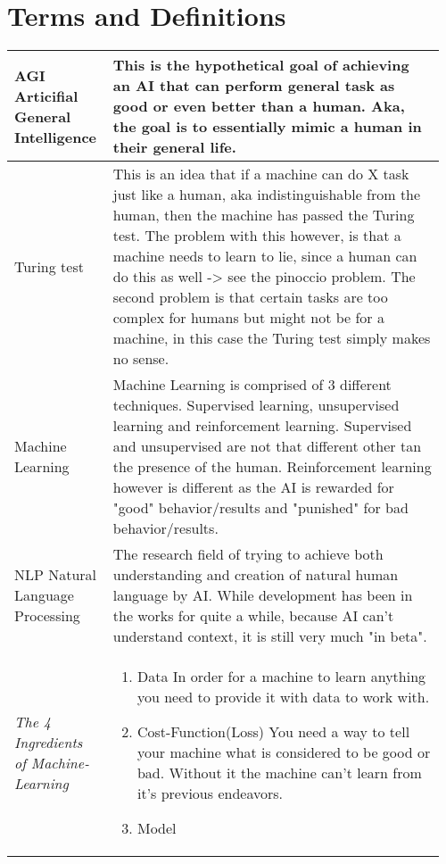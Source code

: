 \documentclass[main.tex,fontsize=8pt,paper=a4,paper=portrait,DIV=calc,]{scrartcl}
\begin{document}
\begin{table}[h!]
\section{Terms and Definitions}
\begin{tabular}{|m{0.2\linewidth}|m{0.755\linewidth}|}
\hline
AGI Articifial General Intelligence & This is the hypothetical goal of achieving an AI that can perform general task as good or even better than a human. Aka, the goal is to essentially mimic a human in their general life. \\
\hline
Turing test & This is an idea that if a machine can do X task just like a human, aka indistinguishable from the human, then the machine has passed the Turing test. The problem with this however, is that a machine needs to learn to lie, since a human can do this as well -> see the pinoccio problem. The second problem is that certain tasks are too complex for humans but might not be for a machine, in this case the Turing test simply makes no sense. \\
\hline
Machine Learning & Machine Learning is comprised of 3 different techniques. Supervised learning, unsupervised learning and reinforcement learning. Supervised and unsupervised are not that different other tan the presence of the human. Reinforcement learning however is different as the AI is rewarded for "good" behavior/results and "punished" for bad behavior/results. \\
\hline
NLP Natural Language Processing & The research field of trying to achieve both understanding and creation of natural human language by AI. While development has been in the works for quite a while, because AI can't understand context, it is still very much "in beta". \\
\hline
\emph{The 4 Ingredients of Machine-Learning} & 
\vspace{2mm}
\begin{enumerate}
\item Data \newline
In order for a machine to learn anything you need to provide it with data to work with.
\item Cost-Function(Loss) \newline
You need a way to tell your machine what is considered to be good or bad. \newline
Without it the machine can't learn from it's previous endeavors.\newline
\item Model \newline

\end{enumerate}
\end{tabular}
\end{table}
\end{document}
